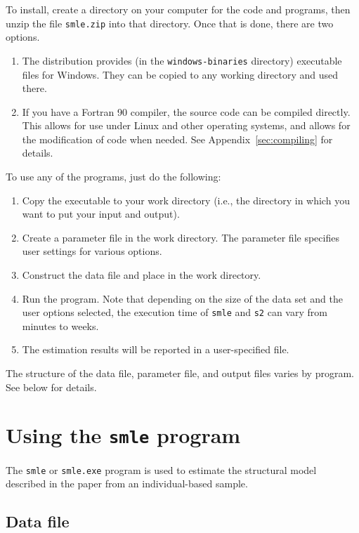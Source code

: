 \documentclass{article}
\begin{document}
To install, create a directory on your computer for the code and programs, then
unzip the file {\tt smle.zip} into that directory.  Once that is done, there are two options.  
\begin{enumerate}
\item The distribution provides (in the {\tt windows-binaries} directory) executable files 
  for Windows.  They can be copied to any working directory and used there.
\item If you have a Fortran 90 compiler, the source code can be compiled 
	directly.  This allows for use under Linux and other operating systems,
	and allows for the modification of code when needed.  See Appendix~\ref{sec:compiling}
	for details.
\end{enumerate}
To use any of the programs, just do the following:
\begin{enumerate}
\item Copy the executable to your work directory (i.e., the 
	directory in which you want to put your input and output).
\item Create a parameter file in the work directory.  The parameter file
	specifies user settings for various options.
\item Construct the data file	and place in the work directory. 
\item Run the program.  Note that depending on the size of the data set and the
	user options selected, the execution time of {\tt smle} and {\tt s2} can vary 
	from minutes to weeks.  
\item The estimation results will be reported in a user-specified file.
\end{enumerate}
The structure of the data file, parameter file, and output files varies by program.
See below for details.

\section{Using the {\tt smle} program }\label{sec:smle}

The {\tt smle} or {\tt smle.exe} program is used to estimate the structural model 
described in the paper from an individual-based sample.  

\subsection{Data file}
\end{document}
